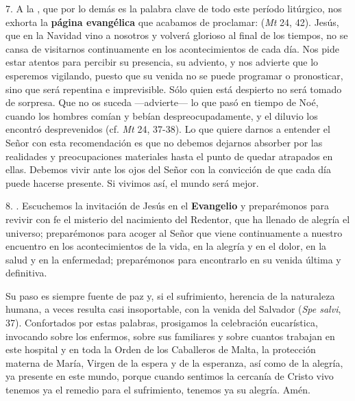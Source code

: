 \documentclass[]{article}
\begin{document}
7. A la , que por lo demás es la palabra clave de todo este período litúrgico, nos exhorta la \textbf{página evangélica} que acabamos de proclamar:  (\emph{Mt} 24, 42). Jesús, que en la Navidad vino a nosotros y volverá glorioso al final de los tiempos, no se cansa de visitarnos continuamente en los acontecimientos de cada día. Nos pide estar atentos para percibir su presencia, su adviento, y nos advierte que lo esperemos vigilando, puesto que su venida no se puede programar o pronosticar, sino que será repentina e imprevisible. Sólo quien está despierto no será tomado de sorpresa. Que no os suceda ---advierte--- lo que pasó en tiempo de Noé, cuando los hombres comían y bebían despreocupadamente, y el diluvio los encontró desprevenidos (cf. \emph{Mt} 24, 37-38). Lo que quiere darnos a entender el Señor con esta recomendación es que no debemos dejarnos absorber por las realidades y preocupaciones materiales hasta el punto de quedar atrapados en ellas. Debemos vivir ante los ojos del Señor con la convicción de que cada día puede hacerse presente. Si vivimos así, el mundo será mejor.

8. . Escuchemos la invitación de Jesús en el \textbf{Evangelio} y preparémonos para revivir con fe el misterio del nacimiento del Redentor, que ha llenado de alegría el universo; preparémonos para acoger al Señor que viene continuamente a nuestro encuentro en los acontecimientos de la vida, en la alegría y en el dolor, en la salud y en la enfermedad; preparémonos para encontrarlo en su venida última y definitiva.

Su paso es siempre fuente de paz y, si el sufrimiento, herencia de la naturaleza humana, a veces resulta casi insoportable, con la venida del Salvador  (\emph{Spe salvi}, 37). Confortados por estas palabras, prosigamos la celebración eucarística, invocando sobre los enfermos, sobre sus familiares y sobre cuantos trabajan en este hospital y en toda la Orden de los Caballeros de Malta, la protección materna de María, Virgen de la espera y de la esperanza, así como de la alegría, ya presente en este mundo, porque cuando sentimos la cercanía de Cristo vivo tenemos ya el remedio para el sufrimiento, tenemos ya su alegría. Amén.

\protect\hypertarget{_Toc448662715}{}{\protect\hypertarget{_Toc448690234}{}{\protect\hypertarget{_Toc448708257}{}{\protect\hypertarget{_Toc448709343}{}{\protect\hypertarget{_Toc449554345}{}{}}}}}
\end{document}
